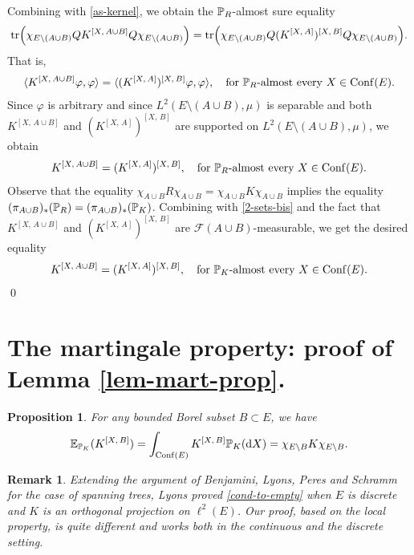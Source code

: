 \documentclass[12pt]{paper}
\newtheorem{proposition}[theorem]{Proposition}
\newtheorem*{remark*}{Remark}
\numberwithin{theorem}{section}
\numberwithin{figure}{section}
\numberwithin{equation}{section}
\begin{document}
 Combining with \eqref{as-kernel}, we obtain the $\mathbb{P}_R$-almost sure equality
 \begin{align*}
 \mathrm{tr} \Big( \chi_{E \setminus (A\cup B)} Q K^{[ X, \, A \cup B ]}  Q \chi_{E \setminus (A\cup B)} \Big) = \mathrm{tr} \Big( \chi_{E \setminus (A\cup B)}   Q(K^{[X,\, A]})^{ [X,\, B]}   Q \chi_{E \setminus (A\cup B)} \Big).
  \end{align*}
That is,
 \begin{align*}
  \langle K^{ [X, \, A \cup B]} \varphi, \varphi\rangle
 =\langle  (K^{[X,\, A]})^{ [X,\, B]} \varphi, \varphi \rangle, \quad \text{for $\mathbb{P}_R$-almost every $X\in \mathrm{Conf}(E)$.}
 \end{align*}
 Since $\varphi$ is arbitrary and since $L^2(E\setminus (A \cup B), \mu)$ is separable and both $K^{ [X, \, A \cup B]}$ and $(K^{[X,\, A]})^{ [X,\, B]}$ are supported on $L^2(E\setminus (A \cup B), \mu)$, we obtain
 \begin{align}\label{2-sets-bis}
 K^{ [X, \, A \cup B]}  =   (K^{[X,\, A]})^{ [X,\, B]}, \quad \text{for $\mathbb{P}_R$-almost every $X\in \mathrm{Conf}(E)$.}
 \end{align}
Observe that the equality $\chi_{A\cup B} R \chi_{A\cup B} = \chi_{A\cup B} K \chi_{A\cup B}$ implies the equality $(\pi_{A\cup B})_{*} (\mathbb{P}_R) = (\pi_{A\cup B})_{*} (\mathbb{P}_K)$. Combining with \eqref{2-sets-bis} and the fact that $K^{ [X, \, A \cup B]}$ and $(K^{[X,\, A]})^{ [X,\, B]}$ are $\mathcal{F}( A\cup B)$-measurable, we get the desired equality
\begin{align*}
 K^{ [X, \, A \cup B]}  =   (K^{[X,\, A]})^{ [X,\, B]}, \quad \text{for $\mathbb{P}_K$-almost every $X\in \mathrm{Conf}(E)$.}
 \end{align*}
\qed



\section{The martingale property: proof of Lemma \ref{lem-mart-prop}.}
\begin{proposition}\label{prop-1-step}
For any bounded Borel subset $B\subset E$, we have
\begin{align}\label{cond-to-empty}
\mathbb{E}_{\mathbb{P}_K} ( K^{[X,\, B]}) =  \int_{\mathrm{Conf}(E)} K^{[X,\, B]}  \mathbb{P}_K(\mathrm{d} X) = \chi_{E\setminus B} K \chi_{E\setminus B}.
\end{align}
\end{proposition}

\begin{remark*}
Extending the argument of Benjamini, Lyons, Peres and Schramm \cite{BLPS} for the case of spanning trees, Lyons \cite[Lemma 7.17]{DPP-L} proved \eqref{cond-to-empty} when $E$ is discrete and $K$ is an orthogonal projection on $\ell^2(E)$. Our proof, based on the local property, is quite different and works both in the continuous and the discrete  setting.
\end{remark*}
\end{document}
